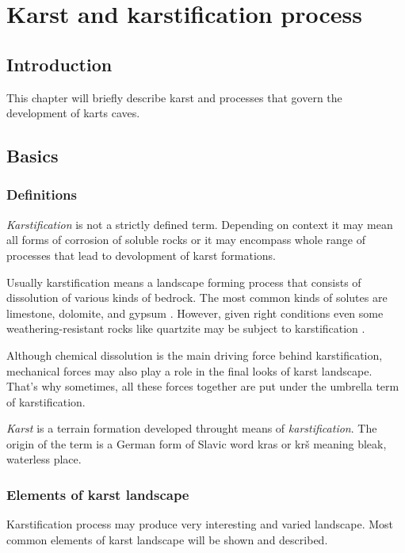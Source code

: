 \chapter{Karst and karstification process}
\section{Introduction}
This chapter will briefly describe karst and processes that govern the
development of karts caves.
\section{Basics}

\subsection{Definitions}
\emph{Karstification} is not a strictly defined term. Depending on context it may
mean all forms of corrosion of soluble rocks or it may encompass whole range of
processes that lead to devolopment of karst formations.

Usually karstification means a landscape forming process that consists of dissolution
of various kinds of bedrock. The most common kinds of solutes are limestone,
dolomite, and gypsum \parencite{karstglossary}. However, given right conditions
even some weathering-resistant rocks like quartzite may be subject to 
karstification \parencite{migon2010}.

Although chemical dissolution is the main driving force behind karstification,
mechanical forces may also play a role in the final looks of karst landscape.
That's why sometimes, all these forces together are put under the umbrella term
of karstification.

\emph{Karst} is a terrain formation developed throught means of
\emph{karstification}. The origin of the term is a German form of Slavic word
kras or krš meaning bleak, waterless place.

\subsection{Elements of karst landscape}

Karstification process may produce very interesting and varied landscape. Most
common elements of karst landscape will be shown and described.

